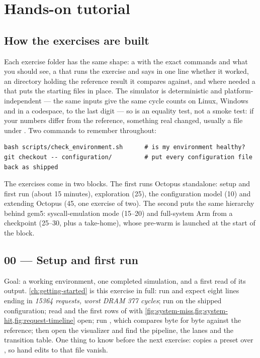 \chapter{Hands-on tutorial}\label{ch:tutorial}


\section{How the exercises are built}

Each exercise folder has the same shape: a  with the exact commands and what
you should see, a  that runs the exercise and says in one line whether it worked,
an  directory holding the reference result it compares against, and where
needed a  that puts the starting files in place. The simulator is deterministic
and platform-independent --- the same inputs give the same cycle counts on Linux, Windows and in
a codespace, to the last digit --- so  is an equality test, not a smoke test: if
your numbers differ from the reference, something real changed, usually a file under
. Two commands to remember throughout:

\begin{lstlisting}[style=shell]
bash scripts/check_environment.sh      # is my environment healthy?
git checkout -- configuration/         # put every configuration file back as shipped
\end{lstlisting}

The exercises come in two blocks. The first runs Octopus standalone: setup and first run
(about 15 minutes), exploration (25), the configuration model (10) and extending Octopus (45,
one exercise of two). The second puts the same hierarchy behind gem5: syscall-emulation mode
(15--20) and full-system Arm from a checkpoint (25--30, plus a take-home), whose pre-warm is
launched at the start of the block.

\section{00 --- Setup and first run}

Goal: a working environment, one completed simulation, and a first read of its output.
\cref{ch:getting-started} is this exercise in full: run 
and expect eight \code{[PASS]} lines ending in \emph{15364 requests, worst DRAM 377 cycles};
run  on the shipped configuration; read  and the first rows of
 with \cref{fig:system-miss,fig:system-hit,fig:request-timeline}
open; run , which compares  byte for byte against the
reference; then open the visualizer and find the pipeline, the lanes and the transition table.
One thing to know before the next exercise:  copies a preset
over , so hand edits to that file vanish.

